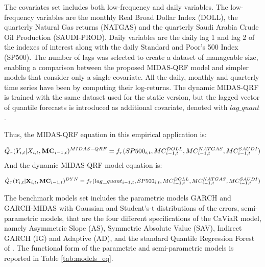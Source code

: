 \vspace{0.15in}

\noindent The covariates set includes both low-frequency and daily variables. The low-frequency variables are the monthly Real Broad Dollar Index (DOLL), the quarterly Natural Gas returns (NATGAS) and the quarterly Saudi Arabia Crude Oil Production (SAUDI-PROD). Daily variables are the daily lag 1 and lag 2 of the indexes of interest along with the daily Standard and Poor's 500 Index (SP500). The number of lags was selected to create a dataset of manageable size, enabling a comparison between the proposed MIDAS-QRF model and simpler models that consider only a single covariate. All the daily, monthly and quarterly time series have been by computing their log-returns.
The dynamic MIDAS-QRF is trained with the same dataset used for the static version, but the lagged vector of quantile forecasts is introduced as additional covariate, denoted with $lag\_quant$.

\noindent Thus, the MIDAS-QRF equation in this empirical application is:

\begin{equation}
\footnotesize
\hat{Q}_{\tau}(Y_{i,t}|X_{i,t}, \mathbf{MC}_{i-1,t})^{MIDAS-QRF}=f_{\tau}(SP500_{i,t}, MC_{i-1,t}^{DOLL}, MC_{i-1,t}^{NATGAS}, MC_{i-1,t}^{SAUDI})
\end{equation}
 And the dynamic MIDAS-QRF model equation is:


\begin{equation}
\footnotesize
\begin{aligned}
    \hat{Q}_{\tau}(Y_{i,t}|\mathbf{X}_{i,t},\mathbf{MC}_{i-1,t})^{DYN} = f_{\tau}(lag\_quant_{i-1,t},
    SP500_{i,t},     MC_{i-1,t}^{DOLL}, MC_{i-1,t}^{NATGAS}, MC_{i-1,t}^{SAUDI})
\end{aligned}
\end{equation}


\vspace{0.15in}

\noindent The benchmark models set includes the parametric models GARCH and GARCH-MIDAS \citep{engle2013stock}  with Gaussian and Student's-t distributions of the errors, semi-parametric models, that are the four different specifications of the CaViaR model, namely Asymmetric Slope (AS), Symmetric Absolute Value (SAV), Indirect GARCH (IG) and Adaptive (AD), and the standard Quantile Regression Forest of \cite{meinshausen2006quantile}. The functional form of the parametric and semi-parametric models is reported in Table \ref{tab:models_eq}.

